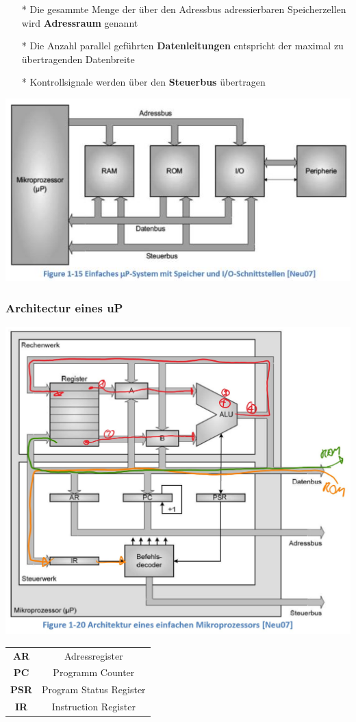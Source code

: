 \begin{itemize}
    \item[*] Die gesammte Menge der über den Adressbus adressierbaren Speicherzellen wird \textbf{Adressraum} genannt
    \item[*] Die Anzahl parallel geführten \textbf{Datenleitungen} entspricht der maximal zu übertragenden Datenbreite
    \item[*] Kontrollsignale werden über den \textbf{Steuerbus} übertragen
\end{itemize}
    \includegraphics[width=0.5\linewidth]{images/SimpleuPSystem}
    
\begin{multicols}{2}    
    \subsubsection{Architectur eines uP}
    \begin{minipage}{1.3\linewidth}
        \includegraphics[width=\linewidth]{images/ArchitectuP}
    \end{minipage}

    \begin{minipage}[r]{4cm} 
        \begin{tabular}[r]{c|c}
            \textbf{AR} & Adressregister  \\ 
            \textbf{PC} & Programm Counter  \\ 
            \textbf{PSR}& Program Status Register \\ 
            \textbf{IR} & Instruction Register  \\ 
        \end{tabular} 
    \end{minipage}
\end{multicols}
    
